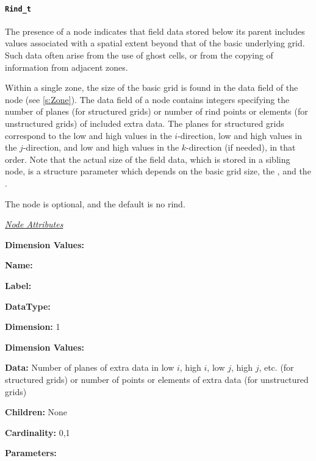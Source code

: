\paragraph{\texttt{Rind\_t}}

The presence of a  node indicates that field data stored
below its parent includes values associated with a spatial extent beyond
that of the basic underlying grid. Such data often arise from the use of
ghost cells, or from the copying of information from adjacent zones.

Within a single zone, the size of the basic grid is found in the data
field of the  node (see \autoref{s:Zone}).
The data field of a  node contains integers specifying
the number of planes (for structured grids) or number of rind points or
elements (for unstructured grids) of included extra data.
The planes for structured grids correspond to the low and high values in
the $i$-direction, low and high values in the $j$-direction, and low and
high values in the $k$-direction (if needed), in that order.
Note that the actual size of the field data, which is stored in a
 sibling node, is a  structure
parameter which depends on the basic grid size, the ,
and the .

The  node is optional, and the default is no rind.

\textit{\uline{Node Attributes}}
\begin{Ventryic}{\textbf{Dimension Values:}}
\item [\textbf{Name:}]
\item [\textbf{Label:}]
\item [\textbf{DataType:}]
\item [\textbf{Dimension:}]
      1
\item [\textbf{Dimension Values:}]
\item [\textbf{Data:}]
      Number of planes of extra data in low $i$, high $i$, low $j$, high
      $j$, etc. (for structured grids) or number of points or elements
      of extra data (for unstructured grids)
\item [\textbf{Children:}]
      None
\item [\textbf{Cardinality:}]
      0,1
\item [\textbf{Parameters:}]
\end{Ventryic}


